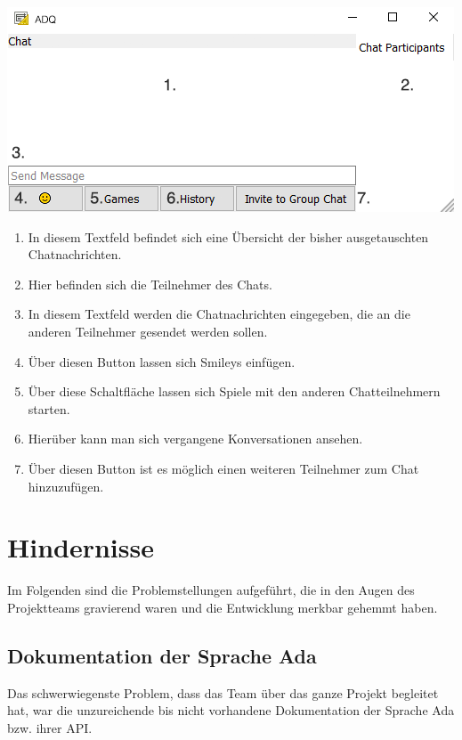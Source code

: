 \documentclass[12pt,a4paper,bibliography=totocnumbered,listof=totocnumbered]{scrartcl}
\begin{document}
\begin{minipage}{\linewidth}
	\centering
	\includegraphics[width=1.0\linewidth]{img/client_chat.png}
	
\end{minipage}
\vspace{1em}
\begin{enumerate}
	\item In diesem Textfeld befindet sich eine Übersicht der bisher ausgetauschten Chatnachrichten.
	\item Hier befinden sich die Teilnehmer des Chats.
	\item In diesem Textfeld werden die Chatnachrichten eingegeben, die an die anderen Teilnehmer gesendet werden sollen.
	\item Über diesen Button lassen sich Smileys einfügen.
	\item Über diese Schaltfläche lassen sich Spiele mit den anderen Chatteilnehmern starten.
	\item Hierüber kann man sich vergangene Konversationen ansehen.
	\item Über diesen Button ist es möglich einen weiteren Teilnehmer zum Chat hinzuzufügen.
\end{enumerate}

\section{Hindernisse}
Im Folgenden sind die Problemstellungen aufgeführt, die in den Augen des Projektteams gravierend waren und die Entwicklung merkbar gehemmt haben.

\subsection{Dokumentation der Sprache Ada}
Das schwerwiegenste Problem, dass das Team über das ganze Projekt begleitet hat, war die unzureichende bis nicht vorhandene Dokumentation der Sprache Ada bzw. ihrer API.
\end{document}
